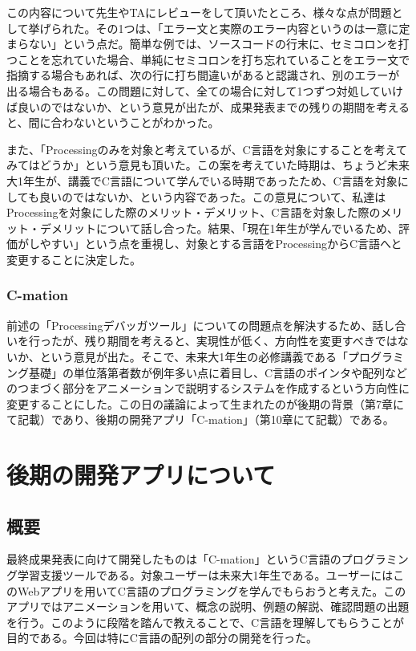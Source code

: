 \documentclass[openany,11pt,papersize]{jsbook}
\begin{document}
\par この内容について先生やTAにレビューをして頂いたところ、様々な点が問題として挙げられた。その1つは、「エラー文と実際のエラー内容というのは一意に定まらない」という点だ。簡単な例では、ソースコードの行末に、セミコロンを打つことを忘れていた場合、単純にセミコロンを打ち忘れていることをエラー文で指摘する場合もあれば、次の行に打ち間違いがあると認識され、別のエラーが出る場合もある。この問題に対して、全ての場合に対して1つずつ対処していけば良いのではないか、という意見が出たが、成果発表までの残りの期間を考えると、間に合わないということがわかった。
 \par また、「Processingのみを対象と考えているが、C言語を対象にすることを考えてみてはどうか」という意見も頂いた。この案を考えていた時期は、ちょうど未来大1年生が、講義でC言語について学んでいる時期であったため、C言語を対象にしても良いのではないか、という内容であった。この意見について、私達はProcessingを対象にした際のメリット・デメリット、C言語を対象した際のメリット・デメリットについて話し合った。結果、「現在1年生が学んでいるため、評価がしやすい」という点を重視し、対象とする言語をProcessingからC言語へと変更することに決定した。


\subsection{C-mation}
\par 前述の「Processingデバッガツール」についての問題点を解決するため、話し合いを行ったが、残り期間を考えると、実現性が低く、方向性を変更すべきではないか、という意見が出た。そこで、未来大1年生の必修講義である「プログラミング基礎」の単位落第者数が例年多い点に着目し、C言語のポインタや配列などのつまづく部分をアニメーションで説明するシステムを作成するという方向性に変更することにした。この日の議論によって生まれたのが後期の背景（第7章にて記載）であり、後期の開発アプリ「C-mation」（第10章にて記載）である。


\chapter{後期の開発アプリについて}

\section{概要}
最終成果発表に向けて開発したものは「C-mation」というC言語のプログラミング学習支援ツールである。対象ユーザーは未来大1年生である。ユーザーにはこのWebアプリを用いてC言語のプログラミングを学んでもらおうと考えた。このアプリではアニメーションを用いて、概念の説明、例題の解説、確認問題の出題を行う。このように段階を踏んで教えることで、C言語を理解してもらうことが目的である。今回は特にC言語の配列の部分の開発を行った。
\end{document}
